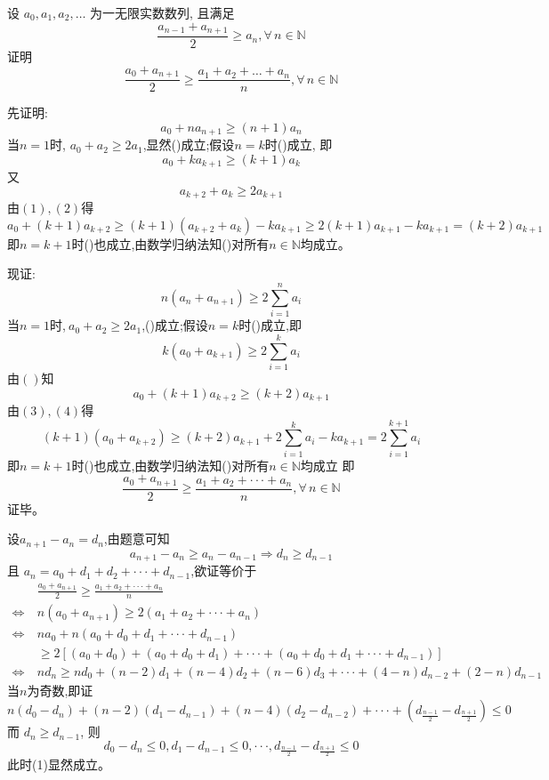 \begin{questions}
    \question 设 $a_0, a_1, a_2, \dots$ 为一无限实数数列, 且满足 $$\frac{a_{n-1}+a_{n+1}}{2} \ge a_n, \forall \,n\in \mathbb{N}$$ 证明 $$\frac{a_0+a_{n+1}}{2} \ge \frac{a_1+a_2+\dots+a_n}{n},\forall \,n\in \mathbb{N}$$
    \begin{solution}
        先证明:
        \[
        a_{0}+na_{n+1}\ge(n+1)a_{n}\tag{}
        \]
        当$n=1$时, $a_{0}+a_{2}\ge2a_{1}$,显然()成立;假设$n=k$时()成立, 即
        \[
        a_{0}+ka_{k+1}\ge(k+1)a_{k}\tag{1}
        \]
        又
        \[
        a_{k+2}+a_{k}\ge2a_{k+1} \tag{2}
        \]
        由$(1),(2)$得$$a_{0}+(k+1)a_{k+2}\ge (k+1)(a_{k+2}+a_k)-ka_{k+1}\ge2(k+1)a_{k+1}-ka_{k+1}=(k+2)a_{k+1}$$即$n=k+1$时()也成立,由数学归纳法知()对所有$n\in \mathbb{N}$均成立。
        
        现证:
        \[
        n(a_{n}+a_{n+1})\ge2\sum_{i=1}^{n}a_{i}\tag{}
        \]
        当$n=1$时,$\ a_{0}+a_{2}\ge2a_{1}$,()成立;假设$n=k$时()成立,即 
        \[
        k(a_{0}+a_{k+1})\ge2\sum_{i=1}^{k}a_{i}\tag{3}
        \]
        由$()$知
        \[
        a_{0}+(k+1)a_{k+2}\ge(k+2)a_{k+1}\tag{4}
        \]
        由$(3),(4)$得$$(k+1)(a_{0}+a_{k+2})\ge(k+2)a_{k+1}+2\sum_{i=1}^{k}a_{i}-ka_{k+1}=2\sum_{i=1}^{k+1}a_{i}$$ 即$n=k+1$时()也成立,由数学归纳法知()对所有$n\in \mathbb{N}$均成立
        即$$\frac{a_{0}+a_{n+1}}{2}\ge\frac{a_{1}+a_{2}+\cdot\cdot\cdot+a_{n}}{n},\forall \,n\in \mathbb{N}$$
        证毕。
    \end{solution}
    \begin{solution}
        设\(a_{n+1}-a_{n}=d_{n}\),由题意可知
        \[
        a_{n+1}-a_{n}\ge a_{n}-a_{n-1}\Rightarrow d_{n}\ge d_{n-1}
        \]
        且 $a_{n}=a_{0}+d_{1}+d_{2}+\cdot\cdot\cdot+d_{n-1}$,欲证等价于
        \begin{align}
        &\frac{a_{0}+a_{n+1}}{2}\ge\frac{a_{1}+a_{2}+\cdot\cdot\cdot+a_{n}}{n}\\
        \Longleftrightarrow \ &n(a_{0}+a_{n+1})\ge2(a_{1}+a_{2}+\cdot\cdot\cdot+a_{n})\\
        \Longleftrightarrow \ &na_{0}+n(a_{0}+d_{0}+d_{1}+\cdot\cdot\cdot+d_{n-1})\\
        &\ge 2[(a_{0}+d_{0})+(a_{0}+d_{0}+d_{1})+\cdot\cdot\cdot+(a_{0}+d_{0}+d_{1}+\cdot\cdot\cdot+d_{n-1})]\\
        \Longleftrightarrow \ &n d_{n}\ge n d_{0}+(n-2)d_{1}+(n-4)d_{2}+(n-6)d_{3}+\cdot\cdot\cdot+(4-n)d_{n-2}+(2-n)d_{n-1}
        \end{align} 
        当$n$为奇数,即证 \[n(d_{0}-d_{n})+(n-2)(d_{1}-d_{n-1})+(n-4)(d_{2}-d_{n-2})+\cdot\cdot\cdot+(d_{\frac{n-1}{2}}-d_{\frac{n+1}{2}})\le0 \tag{1}\]
        而 $d_{n}\ge d_{n-1}$, 则$$d_{0}-d_{n}\le0, d_{1}-d_{n-1}\le0, \cdot\cdot\cdot, d_{\frac{n-1}{2}}-d_{\frac{n+1}{2}}\le0$$ 此时(1)显然成立。
        

\end{solution}
\end{questions}
